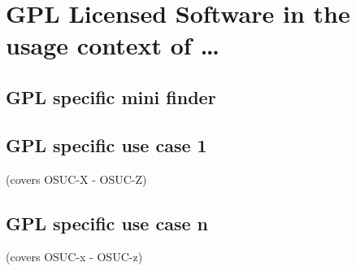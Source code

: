 %
%
%
%
%



\section{GPL Licensed Software in the usage context of \ldots}
\label{OSUC-01-GPL} \label{OSUC-03-GPL} 
\label{OSUC-06-GPL} \label{OSUC-09-GPL}

\label{OSUC-02-GPL} \label{OSUC-04-GPL} \label{OSUC-05-GPL}
\label{OSUC-07-GPL} \label{OSUC-08-GPL} \label{OSUC-10-GPL}

\subsection{GPL specific mini finder}

\subsection{GPL specific use case 1}
(covers OSUC-X - OSUC-Z)

\subsection{GPL specific use case n}
(covers OSUC-x - OSUC-z)


%
